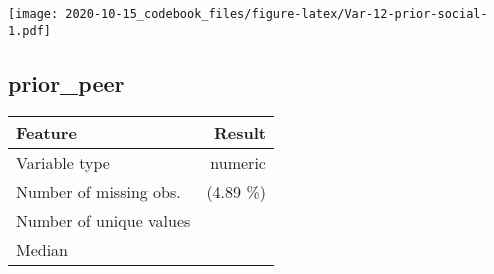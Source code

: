 \documentclass[
]{article}
\begin{document}
\begin{minipage}{0.25 \textwidth}

\texttt{[image: 2020-10-15\_codebook\_files/figure-latex/Var-12-prior-social-1.pdf]}

\end{minipage}

\noindent\makebox[\linewidth]{\rule{\textwidth}{0.4pt}}

\hypertarget{prior_peer}{%
\subsection{prior\_peer}\label{prior_peer}}

\begin{minipage}{0.75 \textwidth}

\begin{longtable}[]{@{}lr@{}}
\toprule
\begin{minipage}[b]{0.34\columnwidth}\raggedright
Feature\strut
\end{minipage} & \begin{minipage}[b]{0.20\columnwidth}\raggedleft
Result\strut
\end{minipage}\tabularnewline
\midrule
\endhead
\begin{minipage}[t]{0.34\columnwidth}\raggedright
Variable type\strut
\end{minipage} & \begin{minipage}[t]{0.20\columnwidth}\raggedleft
numeric\strut
\end{minipage}\tabularnewline
\begin{minipage}[t]{0.34\columnwidth}\raggedright
Number of missing obs.\strut
\end{minipage} & \begin{minipage}[t]{0.20\columnwidth}\raggedleft
266 (4.89 \%)\strut
\end{minipage}\tabularnewline
\begin{minipage}[t]{0.34\columnwidth}\raggedright
Number of unique values\strut
\end{minipage} & \begin{minipage}[t]{0.20\columnwidth}\raggedleft
10\strut
\end{minipage}\tabularnewline
\begin{minipage}[t]{0.34\columnwidth}\raggedright
Median\strut
\end{minipage} & \begin{minipage}[t]{0.20\columnwidth}\raggedleft
1\strut
\end{minipage}\tabularnewline

\end{longtable}
\end{minipage}
\end{document}
